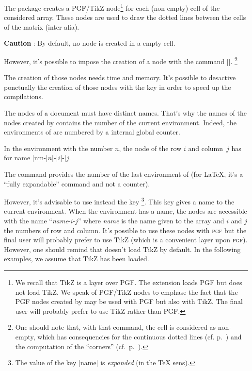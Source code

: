 \documentclass[dvipsnames]{article}%
\begin{document}

The package  creates a PGF/TikZ node\footnote{We recall that TikZ
is a layer over PGF. The extension  loads PGF but does not
load TikZ. We speak of PGF/TikZ nodes to emphase the fact that the PGF nodes
created by  may be used with PGF but also with TikZ. The final
user will probably prefer to use TikZ rather than PGF.} for each (non-empty) cell
of the considered array. These nodes are used to draw the dotted lines between
the cells of the matrix (inter alia).


\smallskip
\textbf{Caution} : By default, no node is created in a empty cell.

\smallskip
However, it's possible to impose the creation of a node with the command
|\NotEmpty|. \footnote{One should note that, with that command, the cell is
considered as non-empty, which has consequencies for the continuous dotted
lines (cf. p.~\pageref{Cdots}) and the computation of the ``corners''
(cf.~p.~\pageref{corners}).}

\medskip
The creation of those nodes needs time and memory. It's possible to desactive
ponctually the creation of those nodes with the key 
in order to speed up the compilations.

\medskip
The nodes of a document must have distinct names. That's why the names of the
nodes created by  contains the number of the current
environment. Indeed, the environments of  are numbered by a
internal global counter. 

\smallskip
In the environment with the number $n$, the node of the row $i$ and
column~$j$ has for name |nm-|$n$|-|$i$|-|$j$. 

\smallskip
The command  provides the number of the
last environment of  (for LaTeX, it's a ``fully expandable''
command and not a counter).

\smallskip
{}
However, it's advisable to use instead the key \footnote{The value of the
key |name| is \emph{expanded} (in the TeX sens).}. This key
gives a name to the current environment. When the environment has a name, the
nodes are accessible with the name ``\textsl{name}-$i$-$j$'' where \textsl{name}
is the name given to the array and $i$ and $j$ the numbers of row and column.
It's possible to use these nodes with \textsc{pgf} but the final user will
probably prefer to use TikZ (which is a convenient layer upon \textsc{pgf}).
However, one should remind that  doesn't load TikZ by default.
In the following examples, we assume that TikZ has been loaded.
\end{document}
